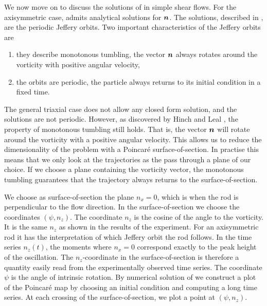 \documentclass[thesis.tex]{subfiles}
\begin{document}
We now move on to discuss the solutions of  in simple shear flows. For the axisymmetric case,  admits analytical solutions for $\mbox{\boldmath$n$}$. The solutions, described in , are the periodic Jeffery orbits. Two important characteristics of the Jeffery orbits are
\begin{enumerate}
	\item they describe monotonous tumbling, the vector $\mbox{\boldmath$n$}$ always rotates around the vorticity with positive angular velocity,
	\item the orbits are periodic, the particle always returns to its initial condition in a fixed time.
\end{enumerate}
The general triaxial case does not allow any closed form solution, and the solutions are not periodic. However, as discovered by Hinch and Leal \cite{hinch1979}, the property of monotonous tumbling still holds. That is, the vector $\mbox{\boldmath$n$}$ will rotate around the vorticity with a positive angular velocity. This allows us to reduce the dimensionality of the problem with a Poincar\'e surface-of-section. In practise this means that we only look at the trajectories as the pass through a plane of our choice. If we choose a plane containing the vorticity vector, the monotonous tumbling guarantees that the trajectory always returns to the surface-of-section.

We choose as surface-of-section the plane $n_x=0$, which is when the rod is perpendicular to the flow direction. In the surface-of-section we choose the coordinates $(\psi, n_z)$. The coordinate $n_z$ is the cosine of the angle to the vorticity. It is the same $n_z$ as shown in the results of the experiment. For an axisymmetric rod it has the interpretation of which Jeffery orbit the rod follows. In the time series $n_z(t)$, the moments where $n_x=0$ correspond exactly to the peak height of the oscillation. The $n_z$-coordinate in the surface-of-section is therefore a quantity easily read from the experimentally observed time series. The coordinate $\psi$ is the angle of intrinsic rotation. By numerical solution of  we construct a plot of the Poincar\'e map by choosing an initial condition and computing a long time series. At each crossing of the surface-of-section, we plot a point at $(\psi, n_z)$.
\end{document}
